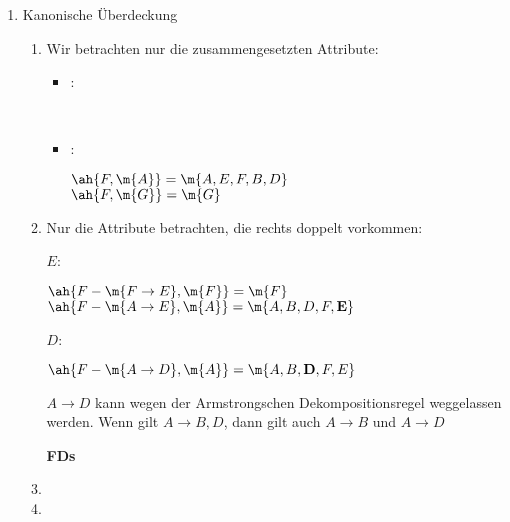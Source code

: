 \documentclass{lehramt-informatik-aufgabe}
\begin{document}
\begin{liAntwort}

\begin{enumerate}

\item Kanonische Überdeckung

\begin{enumerate}

%

\item {}

Wir betrachten nur die zusammengesetzten Attribute:

\begin{itemize}
\item {}:

 \\

\item {}:

$\ah{F, \m{A}} = \m{A, E, F, B, D}$ \\
$\ah{F, \m{G}} = \m{G}$
\end{itemize}


%

\item {}

Nur die Attribute betrachten, die rechts doppelt vorkommen:

$E$:

$\ah{F - \m{F \rightarrow E}, \m{F}} = \m{F}$ \\
$\ah{F - \m{A \rightarrow E}, \m{A}} = \m{A, B, D, F, \textbf{E}}$

$D$:

$\ah{F - \m{A \rightarrow D}, \m{A}} = \m{A, B, \textbf{D}, F, E}$

$A \rightarrow D$ kann wegen der Armstrongschen Dekompositionsregel
weggelassen werden. Wenn gilt $A \rightarrow B, D$, dann gilt auch $A
\rightarrow B$ und $A \rightarrow D$

\textbf{FDs}


\item {}


\item {}


\end{enumerate}
\end{enumerate}
\end{liAntwort}
\end{document}
